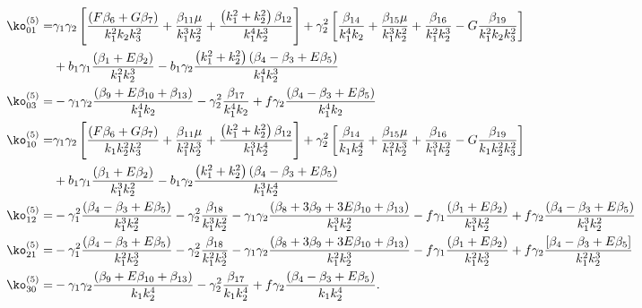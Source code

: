 {\begin{align*}
\ko_{01}^{(5)}=& \gamma_1 \gamma_2 \left[ \frac{\left( F \beta_{6} + G \beta_{7} \right)}{k_1^2 k_2 k_3^2} + \frac{\beta_{11} \mu}{k_1^3 k_2^2} + \frac{\left( k_1^2 + k_2^2 \right) \beta_{12} }{k_1^4 k_2^3} \right] + \gamma_2^2 \left[ \frac{\beta_{14}}{k_1^4 k_2} + \frac{\beta_{15} \mu }{k_1^3 k_2^2} + \frac{\beta_{16}}{k_1^2 k_2^3} - G \frac{\beta_{19}}{k_1^2 k_2 k_3^2} \right] \\
&+ b_1 \gamma_1 \frac{\left( \beta_1 + E \beta_2 \right)}{k_1^2 k_2^3} - b_1 \gamma_2 \frac{\left( k_1^2 + k_2^2\right) \left( {\beta_{4}-\beta_{3}} + E \beta_{5} \right)}{k_1^4 k_2^3} \\
\ko_{03}^{(5)}=& - \gamma_1 \gamma_2 \frac{\left( \beta_{9} + E \beta_{10} + \beta_{13} \right)}{k_1^4 k_2} - \gamma_2^2 \frac{\beta_{17}}{k_1^4 k_2} + f \gamma_2 \frac{\left( {\beta_{4}-\beta_{3}} + E \beta_{5} \right)}{k_1^4 k_2 }\\
\ko_{10}^{(5)}=&\gamma_1 \gamma_2 \left[ \frac{\left( F \beta_{6} + G \beta_{7} \right)}{k_1 k_2^2 k_3^2} + \frac{\beta_{11} \mu}{k_1^2 k_2^3} + \frac{\left( k_1^2 + k_2^2 \right) \beta_{12}}{k_1^3 k_2^4}\right] + \gamma_2^2 \left[ \frac{\beta_{14}}{k_1 k_2^4} + \frac{\beta_{15} \mu}{k_1^2 k_2^3} + \frac{\beta_{16}}{k_1^3 k_2^2} - G \frac{\beta_{19}}{k_1 k_2^2 k_3^2} \right] \\
&+ b_1 \gamma_1 \frac{\left( \beta_1 + E \beta_2 \right)}{k_1^3 k_2^2} - b_1 \gamma_2 \frac{\left( k_1^2 + k_2^2\right) \left( {\beta_{4}-\beta_{3}} + E \beta_{5} \right)}{k_1^3 k_2^4} \\
\ko_{12}^{(5)}=& - \gamma_1^2 \frac{\left( {\beta_{4}-\beta_{3}} + E \beta_{5} \right)}{k_1^3 k_2^2} - \gamma_2^2 \frac{\beta_{18}}{k_1^3 k_2^2} - \gamma_1 \gamma_2 \frac{\left( \beta_{8} + 3 \beta_{9} + 3 E \beta_{10} + \beta_{13} \right) }{k_1^3 k_2^2} - f \gamma_1 \frac{\left( \beta_1 + E \beta_2 \right)}{k_1^3 k_2^2} + f \gamma_2 \frac{\left( {\beta_{4}-\beta_{3}} + E \beta_{5} \right)}{k_1^3 k_2^2}\\
\ko_{21}^{(5)}=& - \gamma_1^2 \frac{\left( {\beta_{4}-\beta_{3}} + E \beta_{5} \right)}{k_1^2 k_2^3} - \gamma_2^2 \frac{\beta_{18}}{k_1^2 k_2^3} - \gamma_1 \gamma_2 \frac{\left( \beta_{8} + 3 \beta_{9} + 3 E \beta_{10} + \beta_{13} \right)}{k_1^2 k_2^3} - f \gamma_1 \frac{\left( \beta_1 + E \beta_2 \right)}{k_1^2 k_2^3} + f \gamma_2 \frac{\left[ {\beta_{4}-\beta_{3}} + E \beta_{5} \right]}{k_1^2 k_2^3} \\
\ko_{30}^{(5)}=& -\gamma_1 \gamma_2 \frac{\left( \beta_{9} + E \beta_{10} + \beta_{13} \right)}{k_1 k_2^4} - \gamma_2^2 \frac{\beta_{17}}{k_1 k_2^4} + f \gamma_2 \frac{\left( {\beta_{4}-\beta_{3}} + E \beta_{5} \right)}{k_1 k_2^4} .
\end{align*}

}
